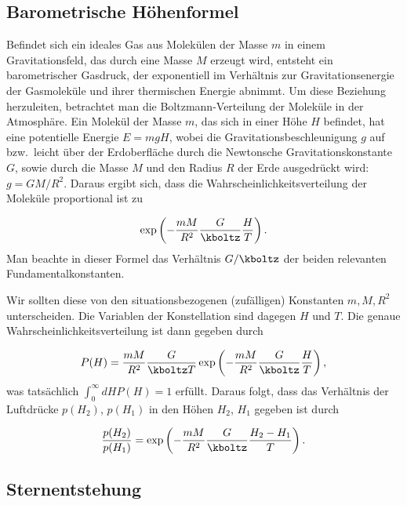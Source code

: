 \documentclass{scrartcl}
\begin{document}
\subsection*{Barometrische Höhenformel}

Befindet sich ein ideales Gas aus Molekülen der Masse $m$ in einem Gravitationsfeld, das durch eine Masse $M$ erzeugt wird, entsteht ein barometrischer Gasdruck, der exponentiell im Verhältnis zur Gravitationsenergie der Gasmoleküle und ihrer thermischen Energie abnimmt. Um diese Beziehung herzuleiten, betrachtet man die Boltzmann-Verteilung der Moleküle in der Atmosphäre. Ein Molekül der Masse $m$, das sich in einer Höhe $H$ befindet, hat eine potentielle Energie $E=m g H$, wobei die Gravitationsbeschleunigung $g$ auf bzw.\ leicht über der Erdoberfläche durch die Newtonsche Gravitationskonstante $G$, sowie durch die Masse $M$ und den Radius $R$ der Erde ausgedrückt wird: $g=G M/R^2$. Daraus ergibt sich, dass die Wahrscheinlichkeitsverteilung der Moleküle proportional ist zu 

\begin{equation*}\label{eq:barometric_height}
  \exp\left(-\frac{m M}{R^2}\frac{G}{\kboltz} \frac{H}{T}\right).
\end{equation*}
%
Man beachte in dieser Formel das Verhältnis $G/\kboltz$ der beiden relevanten Fundamentalkonstanten.

Wir sollten diese von den situationsbezogenen (zufälligen) Konstanten $m, M, R^2$ unterscheiden. Die Variablen der Konstellation sind dagegen $H$ und $T$. Die genaue Wahrscheinlichkeitsverteilung ist dann gegeben durch

\begin{equation*}\label{eq:barometric_height_full_1}
  P(H)=\frac{m M}{R^2}\frac{G}{\kboltz T} \exp\left(-\frac{m M}{R^2}\frac{G}{\kboltz} \frac{H}{T}\right),
\end{equation*} 
%
was tatsächlich $\int_0^\infty dH P(H)=1$ erfüllt. Daraus folgt, dass das Verhältnis der Luftdrücke $p(H_2)$, $p(H_1)$ in den Höhen $H_2$, $H_1$ gegeben ist durch

\begin{equation*}\label{eq:barometric_height_full_2}
  \frac{p(H_2)}{p(H_1)}=\exp\left(-\frac{m M}{R^2}\frac{G}{\kboltz} \frac{H_2-H_1}{T}\right).
\end{equation*}


\subsection*{Sternentstehung}
\end{document}
